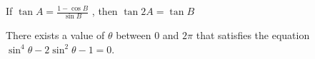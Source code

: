 \iffalse
\title{Trignometric Functions and Equations}
\author{EE24BTECH11001- ADITYA TRIPATHY}
\section{true-false}
\fi
\item If $\tan A = \frac{1-\cos B}{\sin B}$ , then $\tan 2A = \tan B$ 
\hfill{}
\item There exists a value of $\theta$ between $0$ and $2\pi$ that satisfies the equation $\sin^{4}\theta -2\sin^{2}\theta-1=0$. 
\hfill{}


